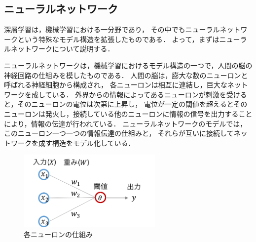 \subsection{ニューラルネットワーク}
深層学習は，機械学習における一分野であり，
その中でもニューラルネットワークという特殊なモデル構造を拡張したものである．
よって，まずはニューラルネットワークについて説明する．

ニューラルネットワークは，機械学習におけるモデル構造の一つで，人間の脳の神経回路の仕組みを模したものである．
人間の脳は，膨大な数のニューロンと呼ばれる神経細胞から構成され，
各ニューロンは相互に連結し，巨大なネットワークを成している．
外界からの情報によってあるニューロンが刺激を受けると，そのニューロンの電位は次第に上昇し，
電位が一定の閾値を超えるとそのニューロンは発火し，接続している他のニューロンに情報の信号を出力することにより，情報の伝達が行われている．
ニューラルネットワークのモデルでは，
このニューロン一つ一つの情報伝達の仕組みと，
それらが互いに接続してネットワークを成す構造をモデル化している．

\begin{figure}[htb]
\begin{center}
\includegraphics[width=200pt]{./img/neuron.png}
\end{center}
\caption{各ニューロンの仕組み}
\label{fig:neuron}
\end{figure}

